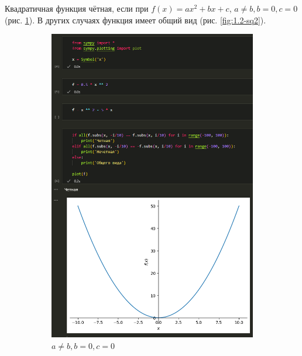 \documentclass[14pt,a4paper]{extarticle}
\begin{document}
Квадратичная функция чётная, если при $f(x)=ax^2+bx+c$, $a\neq b, b=0,c=0$ (рис. \ref{fig:1.2-sq1}).
В других случаях функция имеет общий вид (рис. \ref{fig:1.2-sq2}).

\begin{figure}[!ht]
    \centering
    \begin{subfigure}{.5\textwidth}
        \centering
        \includegraphics[width=0.9\linewidth]{figures/1.2-sq1.png}
        \caption{$a\neq b, b=0,c=0$}
        \label{fig:1.2-sq1}
    \end{subfigure}%
    \begin{subfigure}{.5\textwidth}
        \centering

\end{subfigure}
\end{figure}
\end{document}
